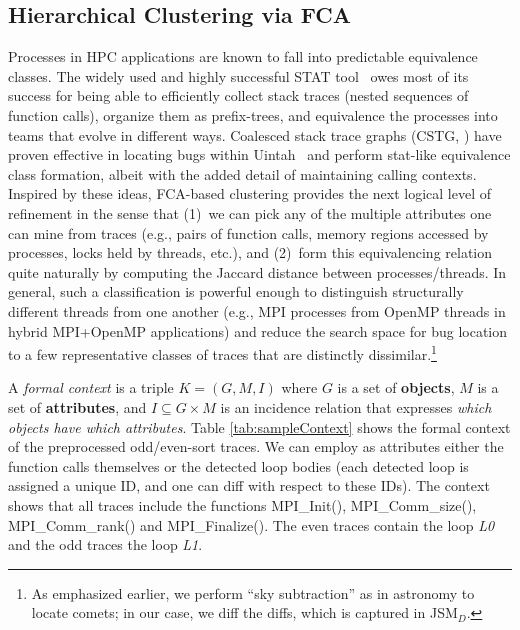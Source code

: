 \subsection{Hierarchical Clustering via FCA}
Processes in HPC applications are known to fall into predictable equivalence classes.
%
The widely used and highly successful STAT tool~\cite{stat} owes most of its
success for being able to efficiently collect stack traces (nested sequences of function
calls), organize them as prefix-trees, and equivalence the processes into teams that
evolve in different ways.
%
Coalesced stack trace graphs (CSTG, \cite{cstg}) have proven effective in
locating bugs within Uintah~\cite{uintah} and perform stat-like equivalence class formation,
albeit with the added detail of maintaining calling contexts.
%
Inspired by these ideas, FCA-based clustering provides the next logical level of refinement
in the sense that (1)~we can pick any of the multiple attributes one can mine from traces (e.g.,
pairs of function calls, memory regions accessed by processes, locks held by threads, etc.), and (2)~form this equivalencing relation quite naturally by computing the Jaccard distance between processes/threads.
%
In general,
such a classification is powerful enough to
distinguish structurally different threads from one another
(e.g., MPI processes from OpenMP threads in hybrid MPI+OpenMP applications)
and reduce the search space for bug location to a few representative classes of traces that
are distinctly dissimilar.\footnote{As emphasized earlier, we perform ``sky subtraction'' as
  in astronomy to locate comets; in our case, we diff the diffs, which is
  captured in JSM$_{D}$.}

A \textit{formal context} is a triple $K = (G, M, I)$
where $G$ is a set of \textbf{objects},
$M$ is a set of \textbf{attributes},
and $I \subseteq G \times M$ is an incidence relation that expresses
\textit{which objects have which attributes}.
Table \ref{tab:sampleContext} shows the formal context of the preprocessed odd/even-sort traces.
%
We can employ as attributes either the function calls themselves or the detected loop bodies
(each detected loop is assigned a unique ID, and one can diff with respect to these IDs).
%
The context shows that all traces include the functions MPI\_Init(),
MPI\_Comm\_size(), MPI\_Comm\_rank() and MPI\_Finalize().
The even traces contain the loop \textit{L0} and the odd traces the loop \textit{L1}.
%

% 

